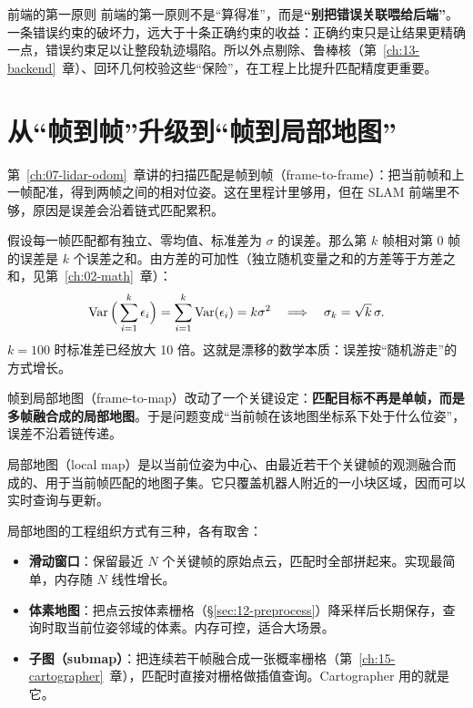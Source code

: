 \begin{keybox}{前端的第一原则}
前端的第一原则不是``算得准''，而是\textbf{``别把错误关联喂给后端''}。一条错误约束的破坏力，远大于十条正确约束的收益：正确约束只是让结果更精确一点，错误约束足以让整段轨迹塌陷。所以外点剔除、鲁棒核（第~\ref{ch:13-backend}~章）、回环几何校验这些``保险''，在工程上比提升匹配精度更重要。
\end{keybox}

\section{从``帧到帧''升级到``帧到局部地图''}\label{sec:12-ftm}

第~\ref{ch:07-lidar-odom}~章讲的扫描匹配是帧到帧（frame-to-frame）：把当前帧和上一帧配准，得到两帧之间的相对位姿。这在里程计里够用，但在 SLAM 前端里不够，原因是误差会沿着链式匹配累积。

假设每一帧匹配都有独立、零均值、标准差为 $\sigma$ 的误差。那么第 $k$ 帧相对第 0 帧的误差是 $k$ 个误差之和。由方差的可加性（独立随机变量之和的方差等于方差之和，见第~\ref{ch:02-math}~章）：
\begin{equation}
\operatorname{Var}\Big(\sum_{i=1}^{k}\epsilon_i\Big) = \sum_{i=1}^{k}\operatorname{Var}(\epsilon_i) = k\sigma^{2}
\quad\Longrightarrow\quad
\sigma_k = \sqrt{k}\,\sigma .
\label{eq:12-drift}
\end{equation}
$k=100$ 时标准差已经放大 10 倍。这就是漂移的数学本质：误差按``随机游走''的方式增长。

帧到局部地图（frame-to-map）改动了一个关键设定：\textbf{匹配目标不再是单帧，而是多帧融合成的局部地图}。于是问题变成``当前帧在该地图坐标系下处于什么位姿''，误差不沿着链传递。

\begin{definition}[局部地图]
局部地图（local map）是以当前位姿为中心、由最近若干个关键帧的观测融合而成的、用于当前帧匹配的地图子集。它只覆盖机器人附近的一小块区域，因而可以实时查询与更新。
\end{definition}

局部地图的工程组织方式有三种，各有取舍：
\begin{itemize}
  \item \textbf{滑动窗口}：保留最近 $N$ 个关键帧的原始点云，匹配时全部拼起来。实现最简单，内存随 $N$ 线性增长。
  \item \textbf{体素地图}：把点云按体素栅格（\S\ref{sec:12-preprocess}）降采样后长期保存，查询时取当前位姿邻域的体素。内存可控，适合大场景。
  \item \textbf{子图（submap）}：把连续若干帧融合成一张概率栅格（第~\ref{ch:15-cartographer}~章），匹配时直接对栅格做插值查询。Cartographer 用的就是它。
\end{itemize}


